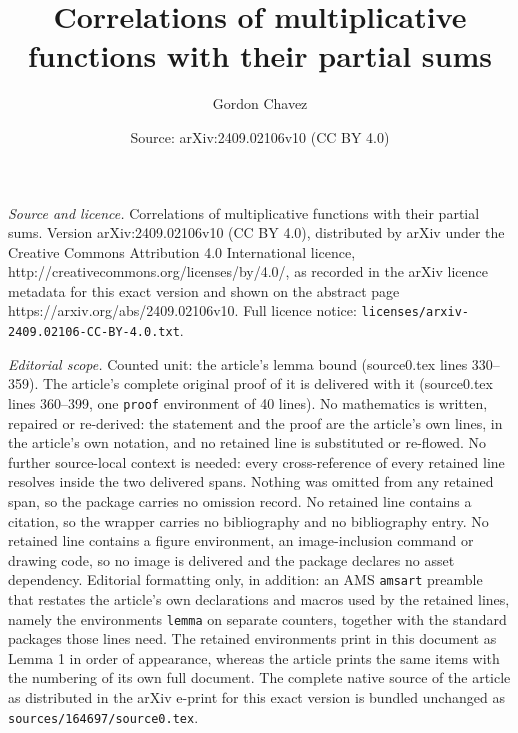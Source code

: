 \documentclass[10pt,a4paper]{amsart}
\title{Correlations of multiplicative functions with their partial sums}
\author{Gordon Chavez}
\date{Source: arXiv:2409.02106v10 (CC BY 4.0)}
\begin{document}
\maketitle

\noindent\emph{Source and licence.} Correlations of multiplicative functions with their partial sums. Version arXiv:2409.02106v10 (CC BY 4.0), distributed by arXiv under the Creative Commons Attribution 4.0 International licence, http://creativecommons.org/licenses/by/4.0/, as recorded in the arXiv licence metadata for this exact version and shown on the abstract page https://arxiv.org/abs/2409.02106v10. Full licence notice: \texttt{licenses/arxiv-2409.02106-CC-BY-4.0.txt}.\par\smallskip

\noindent\textit{Editorial scope.} Counted unit: the article's lemma bound (source0.tex lines 330--359). The article's complete original proof of it is delivered with it (source0.tex lines 360--399, one \texttt{proof} environment of 40 lines). No mathematics is written, repaired or re-derived: the statement and the proof are the article's own lines, in the article's own notation, and no retained line is substituted or re-flowed.  No further source-local context is needed: every cross-reference of every retained line resolves inside the two delivered spans.  Nothing was omitted from any retained span, so the package carries no omission record.  No retained line contains a citation, so the wrapper carries no bibliography and no bibliography entry.  No retained line contains a figure environment, an image-inclusion command or drawing code, so no image is delivered and the package declares no asset dependency.  Editorial formatting only, in addition: an AMS \texttt{amsart} preamble that restates the article's own declarations and macros used by the retained lines, namely the environments \texttt{lemma} on separate counters, together with the standard packages those lines need.  The retained environments print in this document as Lemma 1 in order of appearance, whereas the article prints the same items with the numbering of its own full document.  The complete native source of the article as distributed in the arXiv e-print for this exact version is bundled unchanged as \texttt{sources/164697/source0.tex}.
\end{document}
